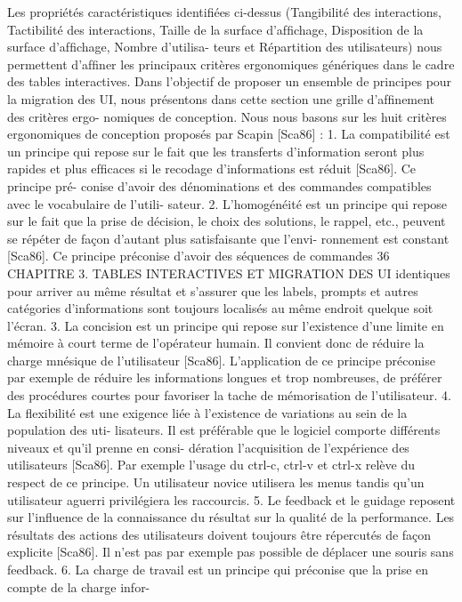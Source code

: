 \documentclass{article}
\begin{document}
Les propriétés caractéristiques identiﬁées ci-dessus (Tangibilité des interactions, Tactibilité des
interactions, Taille de la surface d’afﬁchage, Disposition de la surface d’afﬁchage, Nombre d’utilisa-
teurs et Répartition des utilisateurs) nous permettent d’afﬁner les principaux critères ergonomiques
génériques dans le cadre des tables interactives. Dans l’objectif de proposer un ensemble de principes
pour la migration des UI, nous présentons dans cette section une grille d’afﬁnement des critères ergo-
nomiques de conception. Nous nous basons sur les huit critères ergonomiques de conception proposés
par Scapin [Sca86] :
1. La compatibilité est un principe qui repose sur le fait que les transferts d’information seront
plus rapides et plus efﬁcaces si le recodage d’informations est réduit [Sca86]. Ce principe pré-
conise d’avoir des dénominations et des commandes compatibles avec le vocabulaire de l’utili-
sateur.
2. L’homogénéité est un principe qui repose sur le fait que la prise de décision, le choix des
solutions, le rappel, etc., peuvent se répéter de façon d’autant plus satisfaisante que l’envi-
ronnement est constant [Sca86]. Ce principe préconise d’avoir des séquences de commandes
36
CHAPITRE 3. TABLES INTERACTIVES ET MIGRATION DES UI
identiques pour arriver au même résultat et s’assurer que les labels, prompts et autres catégories
d’informations sont toujours localisés au même endroit quelque soit l’écran.
3. La concision est un principe qui repose sur l’existence d’une limite en mémoire à court terme
de l’opérateur humain. Il convient donc de réduire la charge mnésique de l’utilisateur [Sca86].
L’application de ce principe préconise par exemple de réduire les informations longues et trop
nombreuses, de préférer des procédures courtes pour favoriser la tache de mémorisation de
l’utilisateur.
4. La ﬂexibilité est une exigence liée à l’existence de variations au sein de la population des uti-
lisateurs. Il est préférable que le logiciel comporte différents niveaux et qu’il prenne en consi-
dération l’acquisition de l’expérience des utilisateurs [Sca86]. Par exemple l’usage du ctrl-c,
ctrl-v et ctrl-x relève du respect de ce principe. Un utilisateur novice utilisera les menus tandis
qu’un utilisateur aguerri privilégiera les raccourcis.
5. Le feedback et le guidage reposent sur l’inﬂuence de la connaissance du résultat sur la qualité
de la performance. Les résultats des actions des utilisateurs doivent toujours être répercutés
de façon explicite [Sca86]. Il n’est pas par exemple pas possible de déplacer une souris sans
feedback.
6. La charge de travail est un principe qui préconise que la prise en compte de la charge infor-
\end{document}
